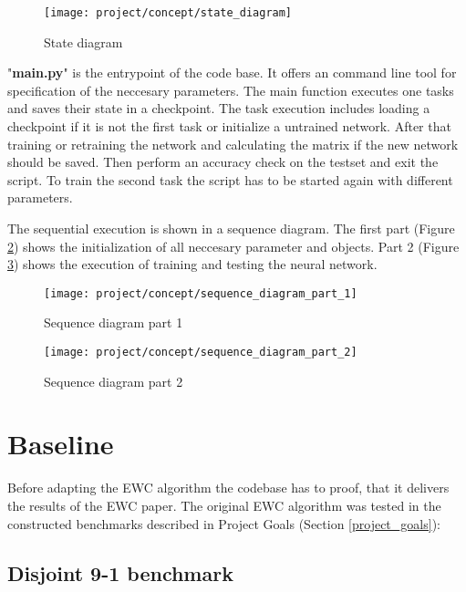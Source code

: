 \begin{figure}[H]
    \centering
    \texttt{[image: project/concept/state\_diagram]}
    \caption{State diagram}
    \label{fig:concept_state_diagram}
\end{figure}

"\textbf{main.py}" is the entrypoint of the code base.
It offers an command line tool for specification of the neccesary parameters.
\newline
The main function executes one tasks and saves their state in a checkpoint.
The task execution includes loading a checkpoint if it is not the first task or initialize a untrained network.
After that training or retraining the network and calculating the matrix if the new network should be saved.
Then perform an accuracy check on the testset and exit the script.
To train the second task the script has to be started again with different parameters.

The sequential execution is shown in a sequence diagram.
The first part (Figure \ref{fig:concept_sequence_diagram_part_1}) shows the initialization of all neccesary parameter and objects.
Part 2 (Figure \ref{fig:concept_sequence_diagram_part_2}) shows the execution of training and testing the neural network.

\begin{figure}[H]
    \centering
    \texttt{[image: project/concept/sequence\_diagram\_part\_1]}
    \caption{Sequence diagram part 1}
    \label{fig:concept_sequence_diagram_part_1}
\end{figure}

\begin{figure}[H]
    \centering
    \texttt{[image: project/concept/sequence\_diagram\_part\_2]}
    \caption{Sequence diagram part 2}
    \label{fig:concept_sequence_diagram_part_2}
\end{figure}

\newpage
\section{Baseline}

Before adapting the EWC algorithm the codebase has to proof, that it delivers the results of the EWC paper.
The original EWC algorithm was tested in the constructed benchmarks described in Project Goals (Section \ref{project_goals}):

\subsection{Disjoint 9-1 benchmark}

